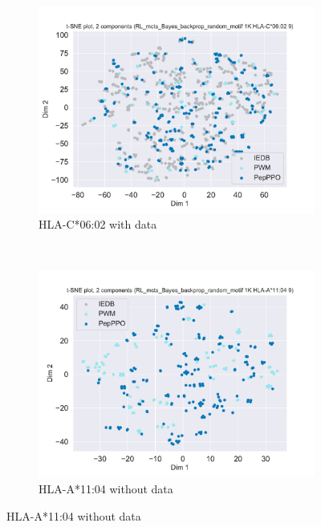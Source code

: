\documentclass[letterpaper]{article}
\begin{document}
\begin{figure}[!t]
    ~~
    \begin{subfigure}[b]{.48\linewidth}
    	\centering
    	\includegraphics[width=\linewidth]{plots/HLA-C0602_RL_mcts_Bayes_backprop_random_motif_1K_9.pdf}
    	\caption{HLA-C*06:02 with data}
    	\label{fig:case:hla-c0602}
    \end{subfigure}
    \\
    \begin{subfigure}[b]{.48\linewidth}
    	\centering
    	\includegraphics[width=\linewidth]{plots/HLA-A1104_RL_mcts_Bayes_backprop_random_motif_1K_9.pdf}
    	\caption{HLA-A*11:04 without data}
    	\label{fig:case:hla-a1104}

\end{subfigure}
\end{figure}
\end{document}
